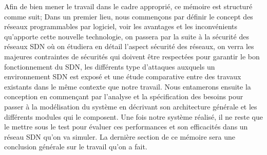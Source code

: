 Afin de bien mener le travail dans le cadre approprié, ce mémoire est structuré comme suit; Dans un premier lieu, nous commençons par définir le concept des réseaux programmables par logiciel, voir les avantages et les inconvénients qu'apporte cette nouvelle technologie, on passera par la suite à la sécurité des réseaux SDN où on étudiera en détail l'aspect sécurité des réseaux, on verra les majeures contraintes de sécurités qui doivent être respectées pour garantir le bon fonctionnement du SDN, les différents type d’attaques auxquels un environnement SDN est exposé et une étude comparative entre des travaux existants dans le même contexte que notre travail. Nous entamerons ensuite la conception en commençant par l'analyse et la spécification des besoins pour passer à la modélisation du système en décrivant son architecture générale et les différents modules qui le composent. Une fois notre système réalisé, il ne reste que le mettre sous le test pour évaluer ces performances et son efficacités dans un réseau SDN qu'on va simuler. La dernière section de ce mémoire sera une conclusion générale sur le travail qu'on a fait.\\
